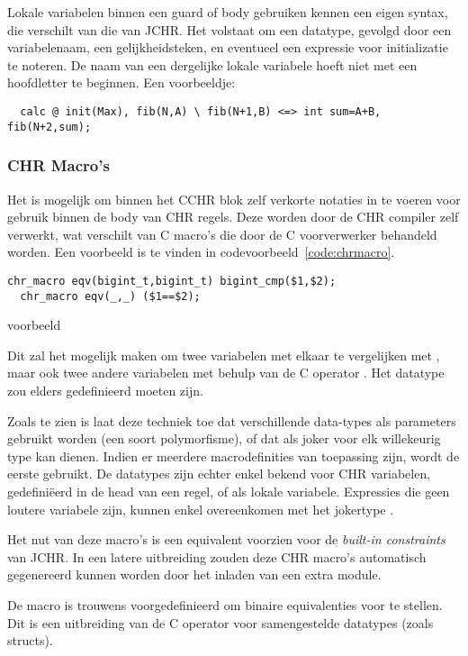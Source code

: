 Lokale variabelen binnen een guard of body gebruiken kennen een eigen syntax, die verschilt van die van JCHR. Het volstaat om een datatype, gevolgd door een variabelenaam, een gelijkheidsteken, en eventueel een expressie voor initializatie te noteren. De naam van een dergelijke lokale variabele hoeft niet met een hoofdletter te beginnen. Een voorbeeldje: \begin{Verbatim}
  calc @ init(Max), fib(N,A) \ fib(N+1,B) <=> int sum=A+B, fib(N+2,sum);
\end{Verbatim}

\subsubsection{CHR Macro's}

Het is mogelijk om binnen het CCHR blok zelf verkorte notaties in te voeren voor gebruik binnen de body van CHR regels. Deze worden door de CHR compiler zelf verwerkt, wat verschilt van C macro's die door de C voorverwerker behandeld worden. Een voorbeeld is te vinden in codevoorbeeld~\ref{code:chrmacro}.
\begin{exCode}
\begin{Verbatim}[frame=single]
  chr_macro eqv(bigint_t,bigint_t) bigint_cmp($1,$2);
  chr_macro eqv(_,_) ($1==$2);
\end{Verbatim}
\caption{ voorbeeld}
\label{code:chrmacro}
\end{exCode}
Dit zal het mogelijk maken om twee  variabelen met elkaar te vergelijken met , maar ook twee andere variabelen met behulp van de C operator \code{==}. Het datatype  zou elders gedefinieerd moeten zijn.

Zoals te zien is laat deze techniek toe dat verschillende data-types als parameters gebruikt worden (een soort polymorfisme), of dat \code{\_} als joker voor elk willekeurig type kan dienen. Indien er meerdere macrodefinities van toepassing zijn, wordt de eerste gebruikt. De datatypes zijn echter enkel bekend voor CHR variabelen, gedefini\"eerd in de head van een regel, of als lokale variabele. Expressies die geen loutere variabele zijn, kunnen enkel overeenkomen met het jokertype \code{\_}.

Het nut van deze macro's is een equivalent voorzien voor de {\em built-in constraints} van JCHR. In een latere uitbreiding zouden deze CHR macro's automatisch gegenereerd kunnen worden door het inladen van een extra module.

De macro  is trouwens voorgedefinieerd om binaire equivalenties voor te stellen. Dit is een uitbreiding van de C operator \code{==} voor samengestelde datatypes (zoals structs).

